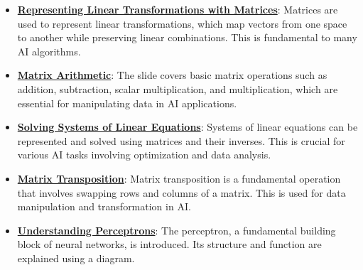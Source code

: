 \documentclass{article}%
\begin{document}
\begin{itemize}[leftmargin=*]%
\item \href{\url{https://purdue.brightspace.com/d2l/common/assets/pdfjs-d2l-dist/1.0.14-legacy/web/viewer.html?file=\%252Fcontent\%252Fenforced\%252F1095467-wl.202510.CS.24300.001\%252F04L1-Linear\%20Algebra\%20Primer.pdf\%253Fou\%253D1095467\&lang=en-us\&container=d2l-fileviewer-rendered-pdf\&fullscreen=d2l-fileviewer-rendered-pdf-dialog\&height=667}#page=5}{\textbf{Representing Linear Transformations with Matrices}}: Matrices are used to represent linear transformations, which map vectors from one space to another while preserving linear combinations. This is fundamental to many AI algorithms.%
\item \href{\url{https://purdue.brightspace.com/d2l/common/assets/pdfjs-d2l-dist/1.0.14-legacy/web/viewer.html?file=\%252Fcontent\%252Fenforced\%252F1095467-wl.202510.CS.24300.001\%252F04L1-Linear\%20Algebra\%20Primer.pdf\%253Fou\%253D1095467\&lang=en-us\&container=d2l-fileviewer-rendered-pdf\&fullscreen=d2l-fileviewer-rendered-pdf-dialog\&height=667}#page=9}{\textbf{Matrix Arithmetic}}: The slide covers basic matrix operations such as addition, subtraction, scalar multiplication, and multiplication, which are essential for manipulating data in AI applications.%
\item \href{\url{https://purdue.brightspace.com/d2l/common/assets/pdfjs-d2l-dist/1.0.14-legacy/web/viewer.html?file=\%252Fcontent\%252Fenforced\%252F1095467-wl.202510.CS.24300.001\%252F04L1-Linear\%20Algebra\%20Primer.pdf\%253Fou\%253D1095467\&lang=en-us\&container=d2l-fileviewer-rendered-pdf\&fullscreen=d2l-fileviewer-rendered-pdf-dialog\&height=667}#page=11}{\textbf{Solving Systems of Linear Equations}}: Systems of linear equations can be represented and solved using matrices and their inverses. This is crucial for various AI tasks involving optimization and data analysis.%
\item \href{\url{https://purdue.brightspace.com/d2l/common/assets/pdfjs-d2l-dist/1.0.14-legacy/web/viewer.html?file=\%252Fcontent\%252Fenforced\%252F1095467-wl.202510.CS.24300.001\%252F04L1-Linear\%20Algebra\%20Primer.pdf\%253Fou\%253D1095467\&lang=en-us\&container=d2l-fileviewer-rendered-pdf\&fullscreen=d2l-fileviewer-rendered-pdf-dialog\&height=667}#page=16}{\textbf{Matrix Transposition}}: Matrix transposition is a fundamental operation that involves swapping rows and columns of a matrix. This is used for data manipulation and transformation in AI.%
\item \href{\url{https://purdue.brightspace.com/d2l/common/assets/pdfjs-d2l-dist/1.0.14-legacy/web/viewer.html?file=\%252Fcontent\%252Fenforced\%252F1095467-wl.202510.CS.24300.001\%252F04L1-Linear\%20Algebra\%20Primer.pdf\%253Fou\%253D1095467\&lang=en-us\&container=d2l-fileviewer-rendered-pdf\&fullscreen=d2l-fileviewer-rendered-pdf-dialog\&height=667}#page=17}{\textbf{Understanding Perceptrons}}: The perceptron, a fundamental building block of neural networks, is introduced. Its structure and function are explained using a diagram.%

\end{itemize}
\end{document}

